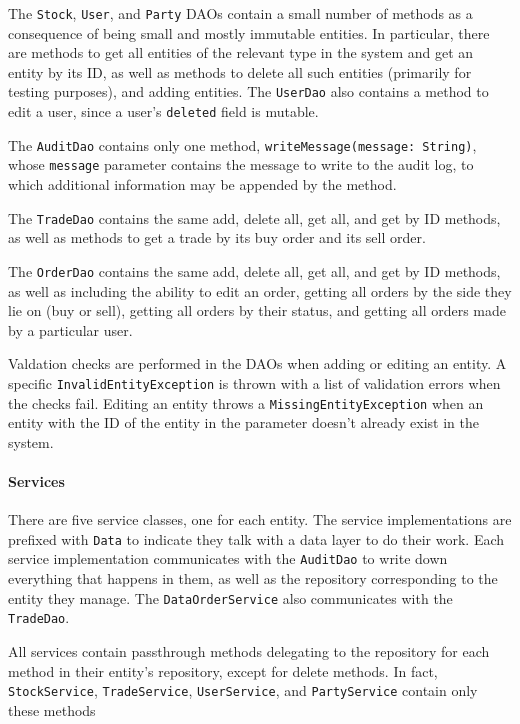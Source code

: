 \documentclass{article}
\begin{document}
The \texttt{Stock}, \texttt{User}, and \texttt{Party} DAOs contain a small number of methods as a consequence of being small and mostly immutable entities. In particular, there are methods to get all entities of the relevant type in the system and get an entity by its ID, as well as methods to delete all such entities (primarily for testing purposes), and adding entities. The \texttt{UserDao} also contains a method to edit a user, since a user's \texttt{deleted} field is mutable.

The \texttt{AuditDao} contains only one method, \texttt{writeMessage(message: String)}, whose \texttt{message} parameter contains the message to write to the audit log, to which additional information may be appended by the method.

The \texttt{TradeDao} contains the same add, delete all, get all, and get by ID methods, as well as methods to get a trade by its buy order and its sell order.

The \texttt{OrderDao} contains the same add, delete all, get all, and get by ID methods, as well as including the ability to edit an order, getting all orders by the side they lie on (buy or sell), getting all orders by their status, and getting all orders made by a particular user.

Valdation checks are performed in the DAOs when adding or editing an entity. A specific \texttt{InvalidEntityException} is thrown with a list of validation errors when the checks fail. Editing an entity throws a \texttt{MissingEntityException} when an entity with the ID of the entity in the parameter doesn't already exist in the system.


\paragraph{Services} There are five service classes, one for each entity. The service implementations are prefixed with \texttt{Data} to indicate they talk with a data layer to do their work. Each service implementation communicates with the \texttt{AuditDao} to write down everything that happens in them, as well as the repository corresponding to the entity they manage. The \texttt{DataOrderService} also communicates with the \texttt{TradeDao}.

All services contain passthrough methods delegating to the repository for each method in their entity's repository, except for delete methods. In fact, \texttt{StockService}, \texttt{TradeService}, \texttt{UserService}, and \texttt{PartyService} contain only these methods
\end{document}
